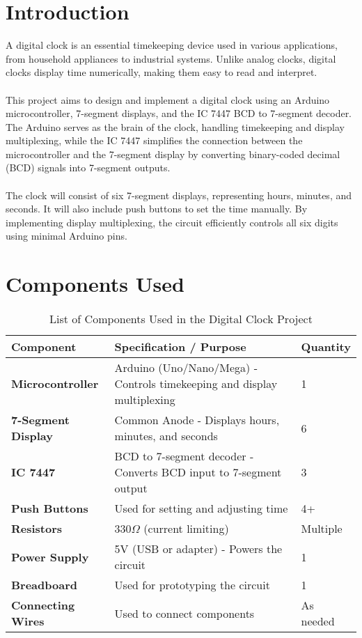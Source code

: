\documentclass[journal]{IEEEtran}
\begin{document}
\section{Introduction}
A digital clock is an essential timekeeping device used in various applications, from household appliances to industrial systems. Unlike analog clocks, digital clocks display time numerically, making them easy to read and interpret. \\ \\
This project aims to design and implement a digital clock using an Arduino microcontroller, 7-segment displays, and the IC 7447 BCD to 7-segment decoder. The Arduino serves as the brain of the clock, handling timekeeping and display multiplexing, while the IC 7447 simplifies the connection between the microcontroller and the 7-segment display by converting binary-coded decimal (BCD) signals into 7-segment outputs. \\ \\
The clock will consist of six 7-segment displays, representing hours, minutes, and seconds. It will also include push buttons to set the time manually. By implementing display multiplexing, the circuit efficiently controls all six digits using minimal Arduino pins.
\newpage

\section{Components Used}
\begin{table}[H]
    \centering
    \renewcommand{\arraystretch}{1.2} %
    \begin{tabular}{|p{4cm}|p{5cm}|p{2cm}|}
        \hline
        \textbf{Component} & \textbf{Specification / Purpose} & \textbf{Quantity} \\
        \hline
        \textbf{Microcontroller} & Arduino (Uno/Nano/Mega) - Controls timekeeping and display multiplexing & 1 \\
        \hline
        \textbf{7-Segment Display} & Common Anode - Displays hours, minutes, and seconds & 6 \\
        \hline
        \textbf{IC 7447} & BCD to 7-segment decoder - Converts BCD input to 7-segment output & 3 \\
        \hline
        \textbf{Push Buttons} & Used for setting and adjusting time & 4+ \\
        \hline
        \textbf{Resistors} &  330$\Omega$ (current limiting) & Multiple \\
        \hline
        \textbf{Power Supply} & 5V (USB or adapter) - Powers the circuit & 1 \\
        \hline
        \textbf{Breadboard} & Used for prototyping the circuit & 1 \\
        \hline
        \textbf{Connecting Wires} & Used to connect components & As needed \\
        \hline
    \end{tabular}
    \caption{List of Components Used in the Digital Clock Project}
    \label{tab:components}
\end{table}
\end{document}

